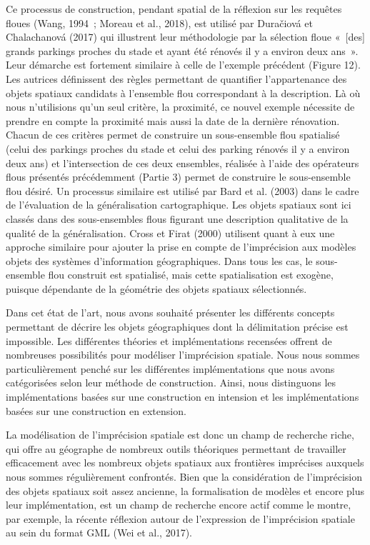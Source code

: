 Ce processus de construction, pendant spatial de la réflexion sur les
requêtes floues (Wang, 1994 ; Moreau et al., 2018), est utilisé par
Duračiová et Chalachanová (2017) qui illustrent leur méthodologie par
la sélection floue « [des] grands parkings proches du stade et ayant
été rénovés il y a environ deux ans ». Leur démarche est fortement
similaire à celle de l’exemple précédent (Figure 12). Les autrices
définissent des règles permettant de quantifier l’appartenance des
objets spatiaux candidats à l’ensemble flou correspondant à la
description. Là où nous n’utilisions qu’un seul critère, la proximité,
ce nouvel exemple nécessite de prendre en compte la proximité mais
aussi la date de la dernière rénovation. Chacun de ces critères permet
de construire un sous-ensemble flou spatialisé (celui des parkings
proches du stade et celui des parking rénovés il y a environ deux ans)
et l’intersection de ces deux ensembles, réalisée à l’aide des
opérateurs flous présentés précédemment (Partie 3) permet de
construire le sous-ensemble flou désiré. Un processus similaire est
utilisé par Bard et al. (2003) dans le cadre de l’évaluation de la
généralisation cartographique. Les objets spatiaux sont ici classés
dans des sous-ensembles flous figurant une description qualitative de
la qualité de la généralisation. Cross et Firat (2000) utilisent quant
à eux une approche similaire pour ajouter la prise en compte de
l’imprécision aux modèles objets des systèmes d’information
géographiques. Dans tous les cas, le sous-ensemble flou construit est
spatialisé, mais cette spatialisation est exogène, puisque dépendante
de la géométrie des objets spatiaux sélectionnés.


Dans cet état de l’art, nous avons souhaité présenter les différents
concepts permettant de décrire les objets géographiques dont la
délimitation précise est impossible. Les différentes théories et
implémentations recensées offrent de nombreuses possibilités pour
modéliser l’imprécision spatiale. Nous nous sommes particulièrement
penché sur les différentes implémentations que nous avons catégorisées
selon leur méthode de construction. Ainsi, nous distinguons les
implémentations basées sur une construction en intension et les
implémentations basées sur une construction en extension.

La modélisation de l’imprécision spatiale est donc un champ de
recherche riche, qui offre au géographe de nombreux outils théoriques
permettant de travailler efficacement avec les nombreux objets
spatiaux aux frontières imprécises auxquels nous sommes régulièrement
confrontés. Bien que la considération de l’imprécision des objets
spatiaux soit assez ancienne, la formalisation de modèles et encore
plus leur implémentation, est un champ de recherche encore actif comme
le montre, par exemple, la récente réflexion autour de l’expression de
l’imprécision spatiale au sein du format GML (Wei et al., 2017).

